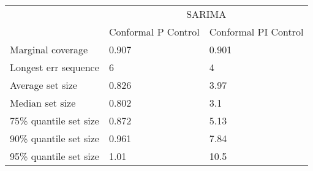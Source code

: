 \begin{tabular}{lll}
\toprule
& \multicolumn{2}{c}{SARIMA} \\
& Conformal P Control & Conformal PI Control \\
\midrule
Marginal coverage & 0.907 & 0.901 \\
Longest err sequence & 6 & 4 \\
Average set size & 0.826 & 3.97 \\
Median set size & 0.802 & 3.1 \\
75\% quantile set size & 0.872 & 5.13 \\
90\% quantile set size & 0.961 & 7.84 \\
95\% quantile set size & 1.01 & 10.5 \\
\bottomrule
\end{tabular}
